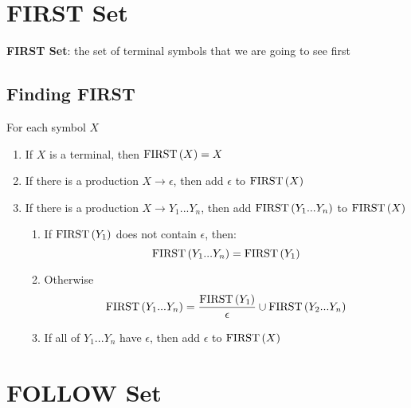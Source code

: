 \section{FIRST Set}

  \begin{definition}
    \textbf{FIRST Set}: the set of terminal symbols that we are going to see
    first
  \end{definition}

  \subsection{Finding FIRST}

    For each symbol $ X $

    \begin{enumerate}
      \item If $ X $ is a terminal, then $ \operatorname{FIRST}\left( X \right) = { X } $
      \item If there is a production $ X \to \epsilon $, then add $ \epsilon $
      to $ \operatorname{FIRST}\left( X \right) $
      \item If there is a production $ X \to Y_{1} ... Y_{n} $, then add
      $ \operatorname{FIRST}\left( Y_{1} ... Y_{n} \right) $ to $ \operatorname{FIRST}\left( X \right) $
      \begin{enumerate}
        \item If $ \operatorname{FIRST}\left( Y_{1} \right) $ does not contain $ \epsilon $,
        then:
        \begin{equation}
          \operatorname{FIRST}\left( Y_{1} ... Y_{n} \right) = \operatorname{FIRST}\left( Y_{1} \right)
        \end{equation}

        \item Otherwise
        \begin{equation}
          \operatorname{FIRST}\left( Y_{1} ... Y_{n} \right) =
            \frac{\operatorname{FIRST}\left( Y_{1} \right)}{\epsilon} \cup
            \operatorname{FIRST}\left( Y_{2} ... Y_{n} \right)
        \end{equation}

        \item If all of $ Y_{1} ... Y_{n} $ have $ \epsilon $, then add
        $ \epsilon $ to $ \operatorname{FIRST}\left( X \right) $
      \end{enumerate}
    \end{enumerate}

\section{FOLLOW Set}

